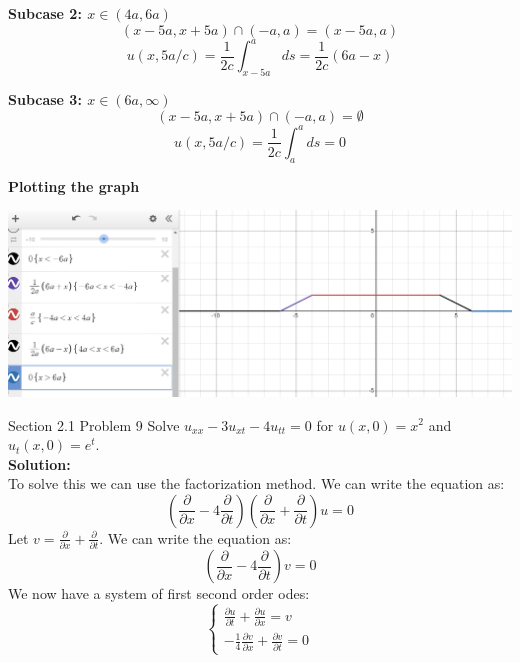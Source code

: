 \documentclass[answers,12pt,addpoints]{exam}
\begin{document}
\begin{questions}
\textbf{Subcase 2: $x \in (4a, 6a)$}\\
$$(x-5a, x+5a) \cap (-a,a) = (x-5a, a)$$
$$u(x,5a/c) = \frac{1}{2c} \int_{x-5a}^{a} ds = \frac{1}{2c}({6a}-x)$$

\textbf{Subcase 3: $x \in (6a, \infty)$}\\
$$(x-5a, x+5a) \cap (-a,a) = \emptyset$$
$$u(x,5a/c) = \frac{1}{2c} \int_{a}^{a} ds = 0$$

\textbf{Plotting the graph}\\

\begin{center}
    \includegraphics[scale = 0.5]{HW3IMG/15.png}
\end{center}

\question Section 2.1 Problem 9
Solve $u_{xx} -3u_{xt} -4u_{tt} = 0$ for $u(x,0) = x^2$ and $u_t(x,0) = e^t$.\\
\textbf{Solution:}\\
To solve this we can use the factorization method. We can write the equation as:
$$ \left( \frac{\partial}{\partial x} - 4 \frac{\partial}{\partial t} \right) \left( \frac{\partial}{\partial x} + \frac{\partial}{\partial t} \right) u = 0$$
Let $v = \frac{\partial}{\partial x} + \frac{\partial}{\partial t}$. We can write the equation as:
$$ \left( \frac{\partial}{\partial x} - 4 \frac{\partial}{\partial t} \right) v = 0$$
We now have a system of first second order odes:
$$
\begin{cases}
    \frac{\partial u }{\partial t} + \frac{\partial u}{\partial x} = v \\
    -\frac{1}{4}\frac{\partial v}{\partial x} + \frac{\partial v}{\partial t} = 0
\end{cases}
$$


\end{questions}
\end{document}
